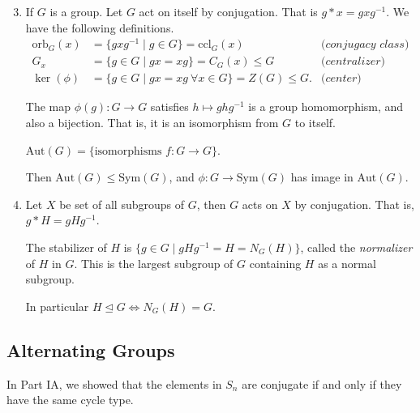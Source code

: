 \begin{enumerate}
    \setcounter{enumi}{2}
    \item If \(G\) is a group. Let \(G\) act on itself by conjugation. That is \(g * x = gxg^{-1}\). We have the following definitions.
    \begin{align*}
        \mathrm{orb}_G(x) &= \{gxg^{-1}\mid g\in G\} = \mathrm{ccl}_G(x) &\textit{(conjugacy class)}\\
        G_x&=\{g\in G\mid gx = xg\} = C_G(x) \leq G &\textit{(centralizer)}\\
        \ker(\phi)&=\{g\in G\mid gx = xg~\forall x\in G\} = Z(G) \leq G. &\textit{(center)}
    \end{align*}
    \begin{note}
        The map \(\phi(g): G\to G\)  satisfies \(h\mapsto ghg^{-1}\) is a group homomorphism, and also a bijection. That is, it is an isomorphism from \(G\) to itself.
    \end{note}
    \begin{definition}{}{}
        \(\mathrm{Aut}(G) = \{\text{isomorphisms } f: G\to G\}\).
    \end{definition}
    Then \(\mathrm{Aut}(G) \leq \mathrm{Sym}(G)\), and \(\phi: G \to  \mathrm{Sym}(G)\) has image in \(\mathrm{Aut}(G)\).
    \item Let \(X\) be set of all subgroups of \(G\), then \(G\) acts on \(X\) by conjugation. That is, \(g*H = gHg^{-1}\).
   
    The stabilizer of \(H\) is \(\{g\in G\mid gHg^{-1}=H = N_G(H)\}\), called the \textit{normalizer} of \(H\) in \(G\). This is the largest subgroup of \(G\) containing \(H\) as a normal subgroup.

    In particular \(H \trianglelefteq G \iff N_G(H) = G\).
\end{enumerate}

\subsection{Alternating Groups}
In Part IA, we showed that the elements in \(S_n\) are conjugate if and only if they have the same cycle type.

